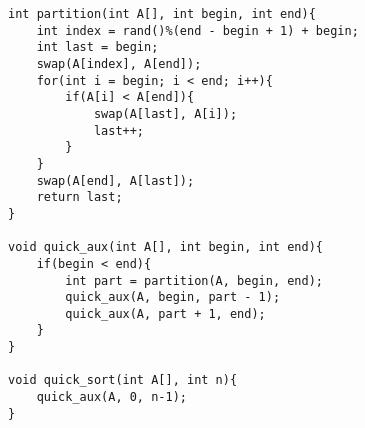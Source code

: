     
\begin{lstlisting}
int partition(int A[], int begin, int end){
	int index = rand()%(end - begin + 1) + begin;
	int last = begin;
	swap(A[index], A[end]);
	for(int i = begin; i < end; i++){
		if(A[i] < A[end]){
			swap(A[last], A[i]);
			last++;
		}
	}
	swap(A[end], A[last]);
	return last;
}

void quick_aux(int A[], int begin, int end){
	if(begin < end){
		int part = partition(A, begin, end);
		quick_aux(A, begin, part - 1);
		quick_aux(A, part + 1, end);
	}
}

void quick_sort(int A[], int n){
	quick_aux(A, 0, n-1);
}
\end{lstlisting}
